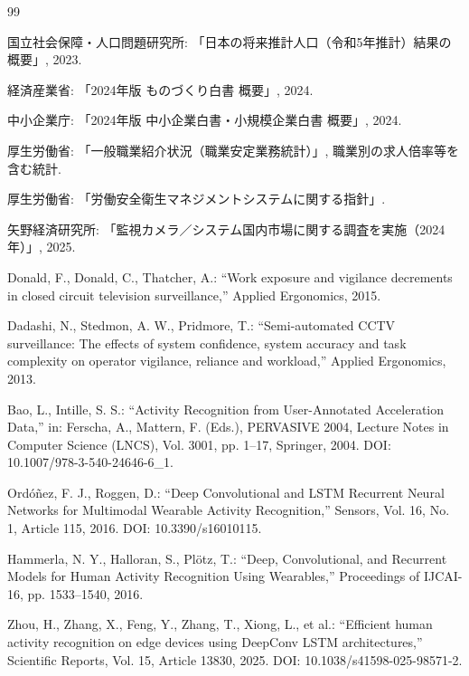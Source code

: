 \documentclass[a4paper,12pt]{jreport}
\begin{document}
\begin{thebibliography}{99}


国立社会保障・人口問題研究所: 「日本の将来推計人口（令和5年推計）結果の概要」, 2023.

経済産業省: 「2024年版 ものづくり白書 概要」, 2024.

中小企業庁: 「2024年版 中小企業白書・小規模企業白書 概要」, 2024.

厚生労働省: 「一般職業紹介状況（職業安定業務統計）」, 職業別の求人倍率等を含む統計.

厚生労働省: 「労働安全衛生マネジメントシステムに関する指針」.

矢野経済研究所: 「監視カメラ／システム国内市場に関する調査を実施（2024年）」, 2025.

Donald, F., Donald, C., Thatcher, A.: ``Work exposure and vigilance decrements in closed circuit television surveillance,''
Applied Ergonomics, 2015.

Dadashi, N., Stedmon, A. W., Pridmore, T.: ``Semi-automated CCTV surveillance: The effects of system confidence, system accuracy and task complexity on operator vigilance, reliance and workload,''
Applied Ergonomics, 2013.

Bao, L., Intille, S. S.: ``Activity Recognition from User-Annotated Acceleration Data,''
in: Ferscha, A., Mattern, F. (Eds.), PERVASIVE 2004, Lecture Notes in Computer Science (LNCS),
Vol. 3001, pp. 1--17, Springer, 2004.
DOI: 10.1007/978-3-540-24646-6\_1.

Ord\'{o}\~{n}ez, F. J., Roggen, D.: ``Deep Convolutional and LSTM Recurrent Neural Networks for Multimodal Wearable Activity Recognition,''
Sensors, Vol. 16, No. 1, Article 115, 2016.
DOI: 10.3390/s16010115.

Hammerla, N. Y., Halloran, S., Pl\"{o}tz, T.: ``Deep, Convolutional, and Recurrent Models for Human Activity Recognition Using Wearables,''
Proceedings of IJCAI-16, pp. 1533--1540, 2016.

Zhou, H., Zhang, X., Feng, Y., Zhang, T., Xiong, L., et al.: ``Efficient human activity recognition on edge devices using DeepConv LSTM architectures,''
Scientific Reports, Vol. 15, Article 13830, 2025.
DOI: 10.1038/s41598-025-98571-2.


\end{thebibliography}
\end{document}
